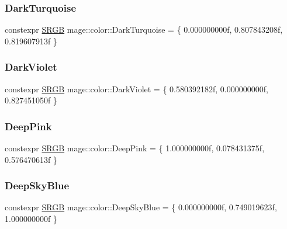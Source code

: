 \hypertarget{namespacemage_1_1color_ae3f6a1f72c4ba6f57385eb1d72f242a4}{}\label{namespacemage_1_1color_ae3f6a1f72c4ba6f57385eb1d72f242a4} 
\subsubsection{\texorpdfstring{Dark\+Turquoise}{DarkTurquoise}}
{\footnotesize\ttfamily constexpr \hyperlink{structmage_1_1_s_r_g_b}{S\+R\+GB} mage\+::color\+::\+Dark\+Turquoise = \{ 0.\+000000000f, 0.\+807843208f, 0.\+819607913f \}}

\hypertarget{namespacemage_1_1color_adf42ad93a5b43879781c81938c52dc88}{}\label{namespacemage_1_1color_adf42ad93a5b43879781c81938c52dc88} 
\subsubsection{\texorpdfstring{Dark\+Violet}{DarkViolet}}
{\footnotesize\ttfamily constexpr \hyperlink{structmage_1_1_s_r_g_b}{S\+R\+GB} mage\+::color\+::\+Dark\+Violet = \{ 0.\+580392182f, 0.\+000000000f, 0.\+827451050f \}}

\hypertarget{namespacemage_1_1color_a112da987930e3b2b88f936e827ab1484}{}\label{namespacemage_1_1color_a112da987930e3b2b88f936e827ab1484} 
\subsubsection{\texorpdfstring{Deep\+Pink}{DeepPink}}
{\footnotesize\ttfamily constexpr \hyperlink{structmage_1_1_s_r_g_b}{S\+R\+GB} mage\+::color\+::\+Deep\+Pink = \{ 1.\+000000000f, 0.\+078431375f, 0.\+576470613f \}}

\hypertarget{namespacemage_1_1color_ac983ca24a416f001878b1bbdbc1dc47e}{}\label{namespacemage_1_1color_ac983ca24a416f001878b1bbdbc1dc47e} 
\subsubsection{\texorpdfstring{Deep\+Sky\+Blue}{DeepSkyBlue}}
{\footnotesize\ttfamily constexpr \hyperlink{structmage_1_1_s_r_g_b}{S\+R\+GB} mage\+::color\+::\+Deep\+Sky\+Blue = \{ 0.\+000000000f, 0.\+749019623f, 1.\+000000000f \}}

